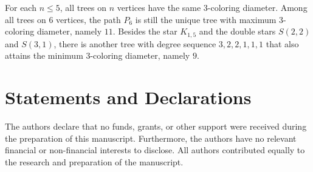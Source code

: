\documentclass[12pt,reqno]{amsart}
\theoremstyle{definition}
\begin{document}
For each $n \le 5$, all trees on $n$ vertices have the same 3-coloring diameter. Among all trees on $6$ vertices, the path $P_6$ is still the unique tree with maximum 3-coloring diameter, namely $11$. Besides the star $K_{1,5}$ and the double stars $S(2,2)$ and $S(3,1)$, there is another tree with degree sequence $3,2,2,1,1,1$ that also attains the minimum 3-coloring diameter, namely $9$.

\section*{Statements and Declarations}

The authors declare that no funds, grants, or other support were received during the preparation of this manuscript. Furthermore, the authors have no relevant financial or non-financial interests to disclose. 
All authors contributed equally to the research and preparation of the manuscript.



\end{document}
